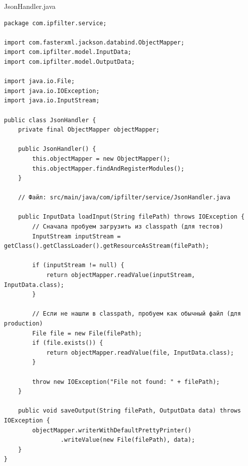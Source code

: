 JsonHandler.java
\begin{verbatim}
package com.ipfilter.service;

import com.fasterxml.jackson.databind.ObjectMapper;
import com.ipfilter.model.InputData;
import com.ipfilter.model.OutputData;

import java.io.File;
import java.io.IOException;
import java.io.InputStream;

public class JsonHandler {
    private final ObjectMapper objectMapper;

    public JsonHandler() {
        this.objectMapper = new ObjectMapper();
        this.objectMapper.findAndRegisterModules();
    }

    // Файл: src/main/java/com/ipfilter/service/JsonHandler.java

    public InputData loadInput(String filePath) throws IOException {
        // Сначала пробуем загрузить из classpath (для тестов)
        InputStream inputStream = getClass().getClassLoader().getResourceAsStream(filePath);

        if (inputStream != null) {
            return objectMapper.readValue(inputStream, InputData.class);
        }

        // Если не нашли в classpath, пробуем как обычный файл (для production)
        File file = new File(filePath);
        if (file.exists()) {
            return objectMapper.readValue(file, InputData.class);
        }

        throw new IOException("File not found: " + filePath);
    }

    public void saveOutput(String filePath, OutputData data) throws IOException {
        objectMapper.writerWithDefaultPrettyPrinter()
                .writeValue(new File(filePath), data);
    }
}
\end{verbatim}

